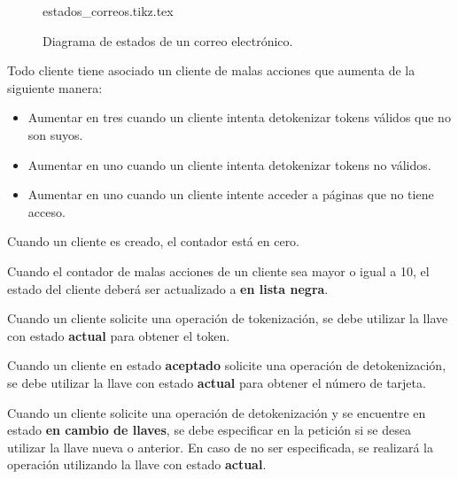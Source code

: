 \begin{figure}
  \begin{center}
    {estados_correos.tikz.tex}
    \caption{Diagrama de estados de un correo electrónico.}
    \label{estados_correo}
  \end{center}
\end{figure}

{
  Todo cliente tiene asociado un cliente de malas acciones que aumenta de la
  siguiente manera:
  \begin{itemize}
    \item Aumentar en tres cuando un cliente intenta detokenizar tokens válidos
      que no son suyos.
    \item Aumentar en uno cuando un cliente intenta detokenizar tokens no
      válidos.
    \item Aumentar en uno cuando un cliente intente acceder a páginas que no
      tiene acceso.
  \end{itemize}

  \begin{hangparas}{2em}{0}
    Cuando un cliente es creado, el contador está en cero.
  \end{hangparas}
}

{
  Cuando el contador de malas acciones de un cliente sea mayor o igual a 10,
  el estado del cliente deberá ser actualizado a  \textbf{en lista negra}.
}

{
  Cuando un cliente solicite una operación de tokenización, se debe utilizar la
  llave con estado \textbf{actual} para obtener el token.
}

{
  Cuando un cliente en estado \textbf{aceptado} solicite una operación de
  detokenización, se debe utilizar la llave con estado \textbf{actual}
  para obtener el número de tarjeta.
}

{
  Cuando un cliente solicite una operación de detokenización y se encuentre en
  estado \textbf{en cambio de llaves}, se debe especificar en la petición si
  se desea utilizar la llave nueva o anterior. En caso de no ser especificada,
  se realizará la operación utilizando la llave con estado \textbf{actual}.
}

